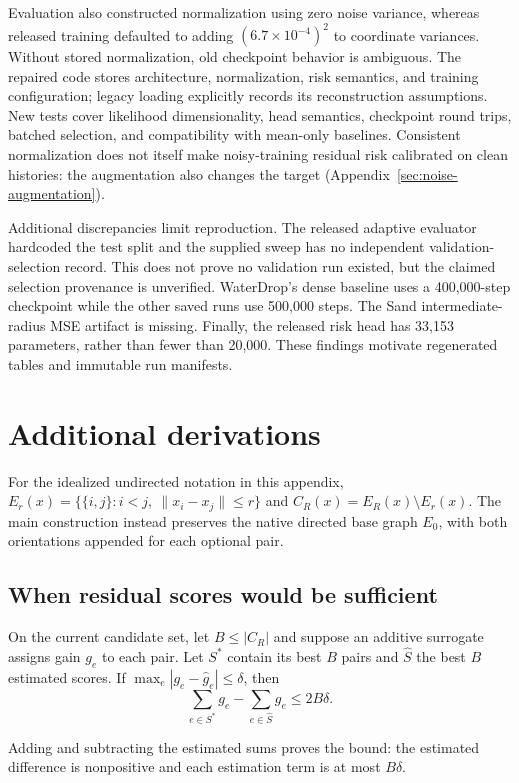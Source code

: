 Evaluation also constructed normalization using zero noise variance, whereas released training defaulted to adding $(6.7\times10^{-4})^2$ to coordinate variances. Without stored normalization, old checkpoint behavior is ambiguous. The repaired code stores architecture, normalization, risk semantics, and training configuration; legacy loading explicitly records its reconstruction assumptions. New tests cover likelihood dimensionality, head semantics, checkpoint round trips, batched selection, and compatibility with mean-only baselines. Consistent normalization does not itself make noisy-training residual risk calibrated on clean histories: the augmentation also changes the target (Appendix~\ref{sec:noise-augmentation}).

Additional discrepancies limit reproduction. The released adaptive evaluator hardcoded the test split and the supplied sweep has no independent validation-selection record. This does not prove no validation run existed, but the claimed selection provenance is unverified. WaterDrop's dense baseline uses a 400,000-step checkpoint while the other saved runs use 500,000 steps. The Sand intermediate-radius MSE artifact is missing. Finally, the released risk head has 33,153 parameters, rather than fewer than 20,000. These findings motivate regenerated tables and immutable run manifests.


\section{Additional derivations}
For the idealized undirected notation in this appendix, $E_r(x)=\{\{i,j\}:i<j,\ \|x_i-x_j\|\le r\}$ and $C_R(x)=E_R(x)\setminus E_r(x)$. The main construction instead preserves the native directed base graph $E_0$, with both orientations appended for each optional pair.
\subsection{When residual scores would be sufficient}
\label{sec:allocation-score-conditions}
\begin{proposition}
On the current candidate set, let $B\le |C_R|$ and suppose an additive surrogate assigns gain $g_e$ to each pair. Let $S^*$ contain its best $B$ pairs and $\widehat S$ the best $B$ estimated scores. If $\max_e|g_e-\widehat g_e|\le\delta$, then
\begin{equation}
 \sum_{e\in S^*}g_e-\sum_{e\in\widehat S}g_e\le2B\delta.
 \label{eq:regret}
\end{equation}
\end{proposition}
Adding and subtracting the estimated sums proves the bound: the estimated difference is nonpositive and each estimation term is at most $B\delta$.

